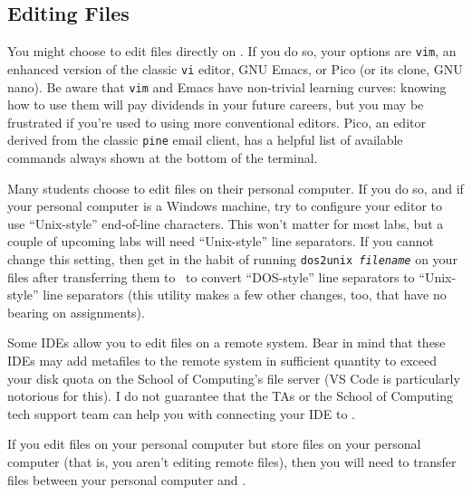 \subsection{Editing Files}

You might choose to edit files directly on \runtimeenvironment.
If you do so, your options are \texttt{vim}, an enhanced version of the classic \texttt{vi} editor, GNU Emacs, or Pico (or its clone, GNU nano).
Be aware that \texttt{vim} and Emacs have non-trivial learning curves: knowing how to use them will pay dividends in your future careers, but you may be frustrated if you're used to using more conventional editors.
Pico, an editor derived from the classic \texttt{pine} email client, has a helpful list of available commands always shown at the bottom of the terminal.


Many students choose to edit files on their personal computer.
If you do so, and if your personal computer is a Windows machine, try to configure your editor to use ``Unix-style'' end-of-line characters.
This won't matter for most labs, but a couple of upcoming labs will need ``Unix-style'' line separators.
If you cannot change this setting, then get in the habit of running \texttt{dos2unix \textit{filename}} on your files after transferring them to \runtimeenvironment\ to convert ``DOS-style'' line separators to ``Unix-style'' line separators (this utility makes a few other changes, too, that have no bearing on \coursenumber assignments).

Some IDEs allow you to edit files on a remote system.
Bear in mind that these IDEs may add metafiles to the remote system in sufficient quantity to exceed your disk quota on the School of Computing's file server (VS Code is particularly notorious for this).
I do not guarantee that the TAs or the School of Computing tech support team can help you with connecting your IDE to \runtimeenvironment.

If you edit files on your personal computer but store files on your personal computer (that is, you aren't editing remote files), then you will need to transfer files between your personal computer and \runtimeenvironment.

